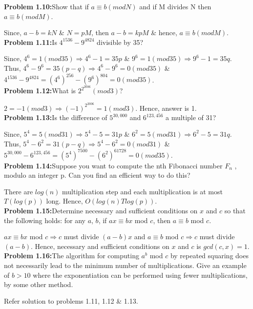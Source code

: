 \documentclass[11pt]{article}
\begin{document}
	\textbf{Problem 1.10:}Show that if $a \equiv b (mod N)$ and if M divides N then $a \equiv b (mod M)$.
	
	Since, $a - b = kN$ \& $N = pM$, then $a - b = kpM$ \& hence, $a \equiv b (mod M)$.\\
	
	\textbf{Problem 1.11:}Is $4^{1536} - 9^{4824}$ divisible by 35?
	
	Since, $4^6 = 1 (mod 35) \Rightarrow 4^6 - 1 = 35p$ \& $9^6 = 1 (mod 35) \Rightarrow 9^6 - 1 = 35q$. Thus, $4^6 - 9^6 = 35(p-q) \Rightarrow 4^6 - 9^6 = 0(mod 35)$ \& $4^{1536} - 9^{4824} = (4^6)^{256} - (9^6)^{804} = 0(mod 35)$.\\
	
	\textbf{Problem 1.12:}What is $2^{2^{2006}}(mod 3)$?
	
	$2 = -1 (mod 3) \Rightarrow (-1)^{2^{2006}} = 1 (mod 3)$. Hence, answer is 1.\\
	
	\textbf{Problem 1.13:}Is the difference of $5^{30,000}$ and $6^{123,456}$ a multiple of 31?
	
	Since, $5^4 = 5 (mod 31) \Rightarrow 5^4 - 5 = 31p$ \& $6^2 = 5 (mod 31) \Rightarrow 6^2 - 5 = 31q$. Thus, $5^4 - 6^2 = 31(p-q) \Rightarrow 5^4 - 6^2 = 0(mod 31)$ \& $5^{30,000} - 6^{123,456} = (5^4)^{7500} - (6^2)^{61728} = 0(mod 35)$.\\
		
	\textbf{Problem 1.14:}Suppose you want to compute the nth Fibonacci number $F_n$ , modulo an integer p. Can you find an efficient way to do this?
	
	There are $log(n)$ multiplication step and each multiplication is at most $T(log(p))$ long. Hence, $O(log(n)Tlog(p))$.\\
	
	\textbf{Problem 1.15:}Determine necessary and sufficient conditions on $x$ and $c$ so that the following holds: for any $a$, $b$, if $ax \equiv bx$ mod $c$, then $a \equiv b$ mod $c$.
	
	$ax \equiv bx$ mod $c \Rightarrow c$ must divide $(a-b)x$ and $a \equiv b$ mod $c \Rightarrow c$ must divide $(a-b)$. Hence, necessary and sufficient conditions on  $x$ and $c$ is $gcd(c,x) = 1$.\\
	
	\textbf{Problem 1.16:}The algorithm for computing $a^b$ mod $c$ by repeated squaring does not necessarily
	lead to the minimum number of multiplications. Give an example of $b > 10$	where the exponentiation can be performed using fewer multiplications, by some other method.
	
	Refer solution to problems 1.11, 1.12 \& 1.13.\\
	
	

	
\end{document}

